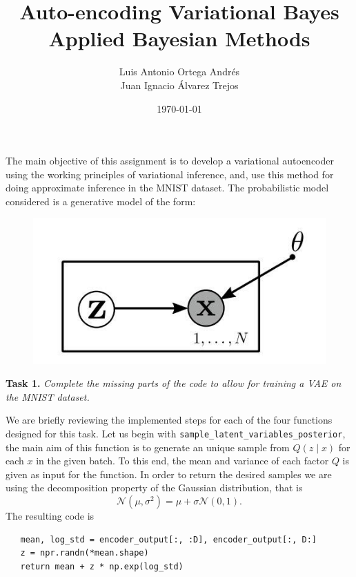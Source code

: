 \documentclass[11pt]{article}
\author{Luis Antonio Ortega Andrés \\\medskip Juan Ignacio Álvarez Trejos}
\date{\today}
\title{Auto-encoding Variational Bayes\\\medskip
\large Applied Bayesian Methods}
\begin{document}
\maketitle

The main objective of this assignment is to develop a variational autoencoder using the working principles of variational inference, and, use this method for doing approximate inference in the MNIST dataset. The probabilistic model considered is a generative model of the form:

\begin{figure}[h]
  \centering
  \includegraphics[scale = 0.5]{imgs/model.jpg}
 \end{figure}

 \textbf{Task 1.} \emph{Complete the missing parts of the code to allow for training a VAE on the MNIST dataset.}

 We are briefly reviewing the implemented steps for each of the four functions designed for this task. Let us begin with \texttt{sample\_latent\_variables\_posterior}, the main aim of this function is to generate an unique sample from \( Q(z \mid x) \) for each \( x \) in the given batch. To this end, the mean and variance of each factor \( Q \) is given as input for the function. In order to return the desired samples we are using the decomposition property of the Gaussian distribution, that is
 \[
   \mathcal{N}(\mu, \sigma^{2}) = \mu + \sigma \mathcal{N}(0, 1).
 \]
 The resulting code is
 \begin{verbatim}
   mean, log_std = encoder_output[:, :D], encoder_output[:, D:]
   z = npr.randn(*mean.shape)
   return mean + z * np.exp(log_std)
 \end{verbatim}
\end{document}
